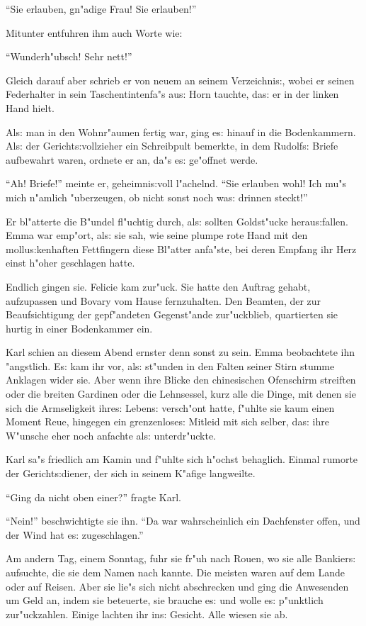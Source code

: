\documentclass[oneside,12pt]{book}
\newcommand{\s}{s:}%
\begin{document}
"`Sie erlauben, gn"adige Frau! Sie erlauben!"'

Mitunter entfuhren ihm auch Worte wie:

"`Wunderh"ubsch! Sehr nett!"'

Gleich darauf aber schrieb er von neuem an seinem Verzeichni{\s},
wobei er seinen Federhalter in sein Taschentintenfa"s au{\s} Horn
tauchte, da{\s} er in der linken Hand hielt.

Al{\s} man in den Wohnr"aumen fertig war, ging e{\s} hinauf in die
Bodenkammern. Al{\s} der Gericht{\s}vollzieher ein Schreibpult
bemerkte, in dem Rudolf{\s} Briefe aufbewahrt waren, ordnete er
an, da"s e{\s} ge"offnet werde.

"`Ah! Briefe!"' meinte er, geheimni{\s}voll l"achelnd. "`Sie
erlauben wohl! Ich mu"s mich n"amlich "uberzeugen, ob nicht sonst
noch wa{\s} drinnen steckt!"'

Er bl"atterte die B"undel fl"uchtig durch, al{\s} sollten
Goldst"ucke herau{\s}fallen. Emma war emp"ort, al{\s} sie sah, wie
seine plumpe rote Hand mit den mollu{\s}kenhaften Fettfingern
diese Bl"atter anfa"ste, bei deren Empfang ihr Herz einst h"oher
geschlagen hatte.

Endlich gingen sie. Felicie kam zur"uck. Sie hatte den Auftrag
gehabt, aufzupassen und Bovary vom Hause fernzuhalten. Den
Beamten, der zur Beaufsichtigung der gepf"andeten Gegenst"ande
zur"uckblieb, quartierten sie hurtig in einer Bodenkammer ein.

Karl schien an diesem Abend ernster denn sonst zu sein. Emma
beobachtete ihn "angstlich. E{\s} kam ihr vor, al{\s} st"unden in
den Falten seiner Stirn stumme Anklagen wider sie. Aber wenn ihre
Blicke den chinesischen Ofenschirm streiften oder die breiten
Gardinen oder die Lehnsessel, kurz alle die Dinge, mit denen sie
sich die Armseligkeit ihre{\s} Leben{\s} versch"ont hatte, f"uhlte
sie kaum einen Moment Reue, hingegen ein grenzenlose{\s} Mitleid
mit sich selber, da{\s} ihre W"unsche eher noch anfachte al{\s}
unterdr"uckte.

Karl sa"s friedlich am Kamin und f"uhlte sich h"ochst behaglich.
Einmal rumorte der Gericht{\s}diener, der sich in seinem K"afige
langweilte.

"`Ging da nicht oben einer?"' fragte Karl.

"`Nein!"' beschwichtigte sie ihn. "`Da war wahrscheinlich ein
Dachfenster offen, und der Wind hat e{\s} zugeschlagen."'

Am andern Tag, einem Sonntag, fuhr sie fr"uh nach Rouen, wo sie
alle Bankier{\s} aufsuchte, die sie dem Namen nach kannte. Die
meisten waren auf dem Lande oder auf Reisen. Aber sie lie"s sich
nicht abschrecken und ging die Anwesenden um Geld an, indem sie
beteuerte, sie brauche e{\s} und wolle e{\s} p"unktlich
zur"uckzahlen. Einige lachten ihr in{\s} Gesicht. Alle wiesen sie
ab.
\end{document}
